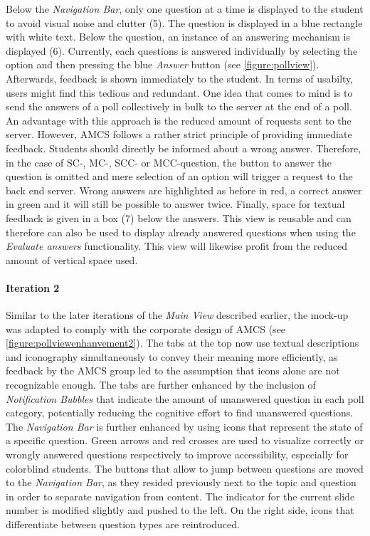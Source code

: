 \newline
\newline
Below the \emph{Navigation Bar}, only one question at a time is displayed to the student to avoid visual noise and clutter (5). The question is displayed in a blue rectangle with white text. Below the question, an instance of an answering mechanism is displayed (6). 
Currently, each questions is answered individually by selecting the option and then pressing the blue \emph{Answer} button (see \autoref{figure:pollview}). Afterwards, feedback is shown immediately to the student. In terms of usabilty, users might find this tedious and redundant. One idea that comes to mind is to send the answers of a poll collectively in bulk to the server at the end of a poll. An advantage with this approach is the reduced amount of requests sent to the server. However, AMCS follows a rather strict principle of providing immediate feedback. Students should directly be informed about a wrong answer.
Therefore, in the case of SC-, MC-, SCC- or MCC-question, the button to answer the question is omitted and mere selection of an option will trigger a request to the back end server.
Wrong answers are highlighted as before in red, a correct answer in green and it will still be possible to answer twice. Finally, space for textual feedback is given in a box (7) below the answers. This view is reusable and can therefore can also be used to display already answered questions when using the \emph{Evaluate answers} functionality. This view will likewise profit from the reduced amount of vertical space used. 

\paragraph{Iteration 2}
Similar to the later iterations of the \emph{Main View} described earlier, the mock-up was adapted to comply with the corporate design of AMCS (see \autoref{figure:pollviewenhanvement2}).
The tabs at the top now use textual descriptions and iconography simultaneously to convey their meaning more efficiently, as feedback by the AMCS group led to the assumption that icons alone are not recognizable enough. The tabs are further enhanced by the inclusion of \emph{Notification Bubbles} that indicate the amount of unanswered question in each poll category, potentially reducing the cognitive effort to find unanswered questions.
The \emph{Navigation Bar} is further enhanced by using icons that represent the state of a specific question. Green arrows and red crosses are used to visualize correctly or wrongly answered questions respectively to improve accessibility, especially for colorblind students.
The buttons that allow to jump between questions are moved to the \emph{Navigation Bar}, as they resided previously next to the topic and question in order to separate navigation from content.
The indicator for the current slide number is modified slightly and pushed to the left. On the right side, icons that differentiate between question types are reintroduced. 
